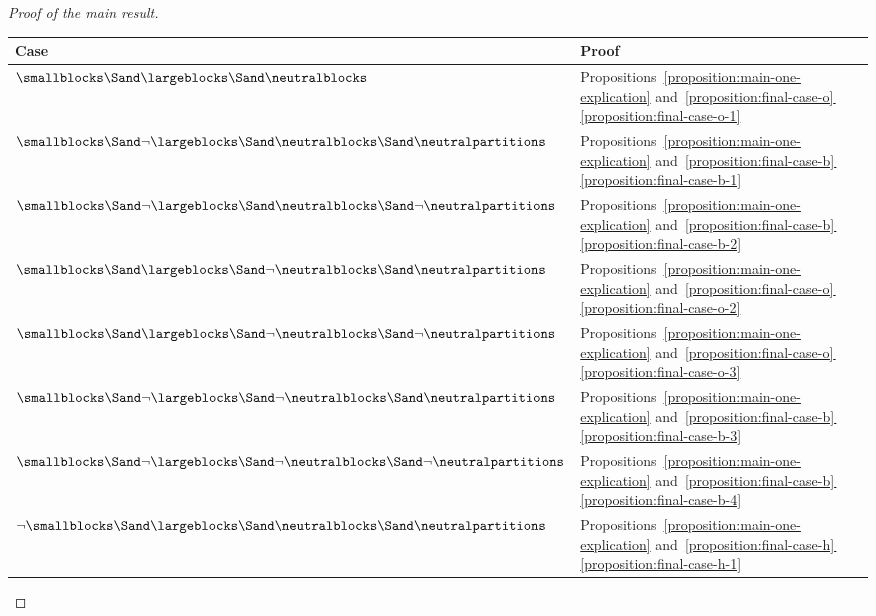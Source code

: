 \documentclass[pdftex]{sigma}
\numberwithin{equation}{section}
\begin{document}
\begin{proof}[Proof of the main result]
    \begin{table}[h!]\centering\renewcommand{\arraystretch}{1.2}
  \begin{tabular}{l|l}
    Case & Proof  \\ \hline
    $\smallblocks \Sand \largeblocks\Sand\neutralblocks$ & Pro\-po\-si\-tions~\ref{proposition:main-one-explication} and~\hyperref[proposition:final-case-o-1]{\ref*{proposition:final-case-o}\,\ref*{proposition:final-case-o-1}}\Tstrut \\
    $\smallblocks \Sand \neg\largeblocks\Sand\neutralblocks\Sand\neutralpartitions$ & Pro\-po\-si\-tions~\ref{proposition:main-one-explication} and~\hyperref[proposition:final-case-b-1]{\ref*{proposition:final-case-b}\,\ref*{proposition:final-case-b-1}}\\
    $\smallblocks \Sand \neg\largeblocks\Sand\neutralblocks\Sand\neg\neutralpartitions$ & Pro\-po\-si\-tions~\ref{proposition:main-one-explication} and~\hyperref[proposition:final-case-b-2]{\ref*{proposition:final-case-b}\,\ref*{proposition:final-case-b-2}}\\
    $\smallblocks \Sand \largeblocks\Sand\neg\neutralblocks\Sand \neutralpartitions$ & Pro\-po\-si\-tions~\ref{proposition:main-one-explication} and~\hyperref[proposition:final-case-o-2]{\ref*{proposition:final-case-o}\,\ref*{proposition:final-case-o-2}}\\
    $\smallblocks \Sand \largeblocks\Sand\neg\neutralblocks\Sand \neg\neutralpartitions$ & Pro\-po\-si\-tions~\ref{proposition:main-one-explication} and~\hyperref[proposition:final-case-o-3]{\ref*{proposition:final-case-o}\,\ref*{proposition:final-case-o-3}}\\
    $\smallblocks \Sand \neg\largeblocks\Sand\neg\neutralblocks\Sand \neutralpartitions$ & Pro\-po\-si\-tions~\ref{proposition:main-one-explication} and~\hyperref[proposition:final-case-b-3]{\ref*{proposition:final-case-b}\,\ref*{proposition:final-case-b-3}}\\
    $\smallblocks \Sand \neg\largeblocks\Sand\neg\neutralblocks\Sand \neg\neutralpartitions$ & Pro\-po\-si\-tions~\ref{proposition:main-one-explication} and~\hyperref[proposition:final-case-b-4]{\ref*{proposition:final-case-b}\,\ref*{proposition:final-case-b-4}}\\
    $\neg\smallblocks \Sand \largeblocks\Sand\neutralblocks\Sand \neutralpartitions$ & Pro\-po\-si\-tions~\ref{proposition:main-one-explication} and~\hyperref[proposition:final-case-h-1]{\ref*{proposition:final-case-h}\,\ref*{proposition:final-case-h-1}}\\

\end{tabular}
\end{table}
\end{proof}
\end{document}
